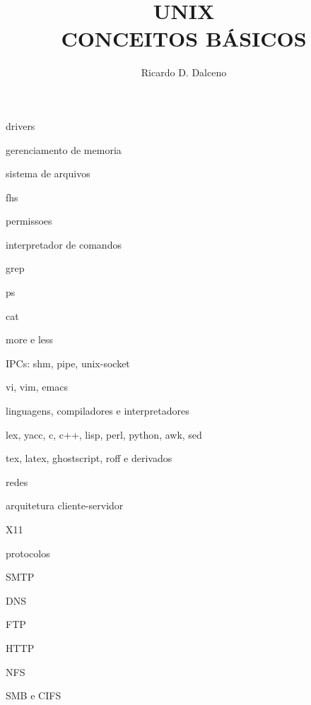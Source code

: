 \documentclass[a4paper,12pt,phv]{book}
\title{\Huge{UNIX\\CONCEITOS BÁSICOS}}
\author{Ricardo D. Dalceno}
\begin{document}
\maketitle
\tableofcontents









drivers

gerenciamento de memoria

sistema de arquivos

fhs

permissoes

interpretador de comandos

grep

ps

cat

more e less

IPCs: shm, pipe, unix-socket

vi, vim, emacs

linguagens, compiladores e interpretadores

lex, yacc, c, c++, lisp, perl, python, awk, sed

tex, latex, ghostscript, roff e derivados

redes

arquitetura cliente-servidor

X11

protocolos

SMTP

DNS

FTP

HTTP

NFS

SMB e CIFS



\begin{appendix}


\end{appendix}
\end{document}
